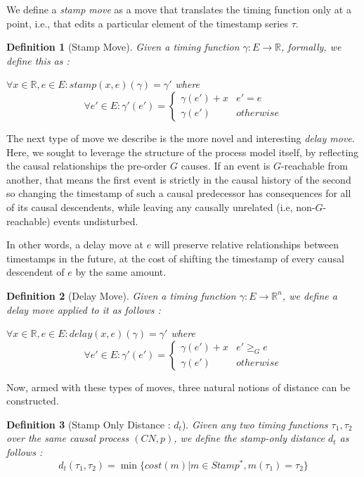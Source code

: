 \documentclass[conference]{IEEEtran}
\newcounter{cases}
\newtheorem{definition}{Definition}
\begin{document}
	We define a \textit{stamp move} as a move that translates the timing function only at a point, i.e., that edits a particular element of the timestamp series $\tau$. 
	
	\begin{definition}[Stamp Move]
		Given a timing function $\gamma : E \to \mathbb{R}$, formally, we define this as : 
		
		$\forall x \in \mathbb{R}, e \in E : stamp(x, e)(\gamma) =\gamma' $ where
		$$\forall e' \in E : \gamma'(e')  = \begin{cases}
			\gamma(e') + x & e' = e \\
			\gamma(e')& otherwise
		\end{cases}$$
		
	\end{definition}
	
	The next type of move we describe is the more novel and interesting \textit{delay move}. 
	Here, we sought to leverage the structure of the process model itself, by reflecting the causal relationships the pre-order $G$ causes. 
	If an event is $G$-reachable from another, that means the first event is strictly in the causal history of the second so changing the timestamp of such a causal predecessor has consequences for all of its causal descendents, while leaving any causally unrelated (i.e, non-$G$-reachable) events undisturbed. 
	
	In other words, a delay move at $e$ will preserve relative relationships between timestamps in the future, at the cost of shifting the timestamp of every causal descendent of $e$ by the same amount. 
	\begin{definition}[Delay Move]
		Given a timing function $\gamma : E \to \mathbb{R}^n$, we define a delay move applied to it as follows : 
		
		$\forall x \in \mathbb{R}, e \in E : delay(x, e)(\gamma) = \gamma'$ where 
		$$\forall e' \in E : \gamma'(e') = \begin{cases}
			\gamma(e') + x & e' \geq_G e \\
			\gamma(e')& otherwise
		\end{cases}$$
		
	\end{definition}
	
	Now, armed with these types of moves, three natural notions of distance can be constructed. 
	
	\begin{definition}[Stamp Only Distance : $d_t$]
		Given any two timing functions $\tau_1, \tau_2$ over the same causal process $(CN, p)$, we define the stamp-only distance $d_t$ as follows : 
		$$d_t(\tau_1, \tau_2) = \min \{cost(m) | {m \in Stamp^*}, {m(\tau_1) = \tau_2}\}$$
	\end{definition}
	
\end{document}
